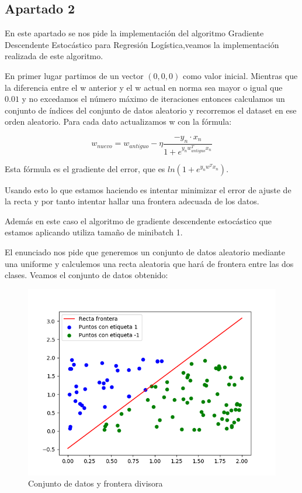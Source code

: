 \documentclass[12pt,a4paper]{article}
\begin{document}
\subsection{Apartado 2}

En este apartado se nos pide la implementación del algoritmo Gradiente Descendente Estocástico para Regresión Logística,veamos la implementación realizada de este algoritmo.

En primer lugar partimos de un vector $(0,0,0)$ como valor inicial. Mientras que la diferencia entre el w anterior y el w actual en norma sea mayor o igual que $0.01$ y no excedamos el número máximo de iteraciones entonces calculamos un conjunto de índices del conjunto de datos aleatorio y recorremos el dataset en ese orden aleatorio. Para cada dato actualizamos w con la fórmula:

$$w_{nuevo} = w_{antiguo}-\eta \frac{-y_n\cdot x_n}{1+e^{y_n w^T_{antiguo}x_n}}$$

Esta fórmula es el gradiente del error, que es $ln(1+e^{y_nw^Tx_n})$.

Usando esto lo que estamos haciendo es intentar minimizar el error de ajuste de la recta y por tanto intentar hallar una frontera adecuada de los datos. 

Además en este caso el algoritmo de gradiente descendente estocástico que estamos aplicando utiliza tamaño de minibatch 1.

El enunciado nos pide que generemos un conjunto de datos aleatorio mediante una uniforme y calculemos una recta aleatoria que hará de frontera entre las dos clases. Veamos el conjunto de datos obtenido:

\begin{figure}[H]
	\centering
	\includegraphics[scale=0.7]{./Imagenes/ej2-23.png}
	\caption{Conjunto de datos y frontera divisora}
\end{figure}
\end{document}
